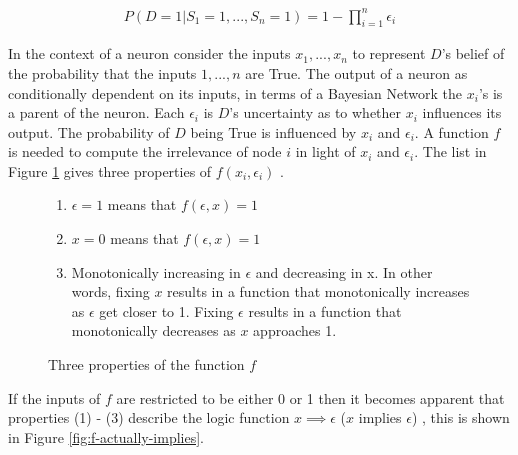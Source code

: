 \begin{align}
P(D = 1 | S_1 = 1, ..., S_n = 1) = 1 - \prod^n_{i=1} \epsilon_i
\label{equ:noisy-or-relation}
\end{align}

In the context of a neuron consider the inputs $x_1, ..., x_n$ to represent $D$'s belief of the probability that the inputs $1, ..., n$ are True. The output of a neuron as conditionally dependent on its inputs, in terms of a Bayesian Network the $x_i$'s is a parent of the neuron. Each $\epsilon_i$ is $D$'s uncertainty as to whether $x_i$ influences its output. The probability of $D$ being True is influenced by $x_i$ and $\epsilon_i$. A function $f$ is needed to compute the irrelevance of node $i$ in light of $x_i$ and $\epsilon_i$. The list in Figure \ref{fig:irelevence-function-cond} gives three properties of $f(x_i, \epsilon_i)$ \cite{LearningLogicalActivations}.\\

\begin{figure}[H]
\begin{enumerate}
	\item $\epsilon = 1$ means that $f(\epsilon, x) = 1$
	\item $x = 0$ means that $f(\epsilon, x) = 1$
	\item Monotonically increasing in $\epsilon$ and decreasing in x. In other words, fixing $x$ results in a function that monotonically increases as $\epsilon$ get closer to 1. Fixing $\epsilon$ results in a function that monotonically decreases as $x$ approaches 1.
\end{enumerate}
\caption{Three properties of the function $f$}
\label{fig:irelevence-function-cond}
\end{figure}

If the inputs of $f$ are restricted to be either 0 or 1 then it becomes apparent that properties (1) - (3) describe the logic function $x \implies \epsilon$ ($x$ implies $\epsilon$) , this is shown in Figure \ref{fig:f-actually-implies}. 

